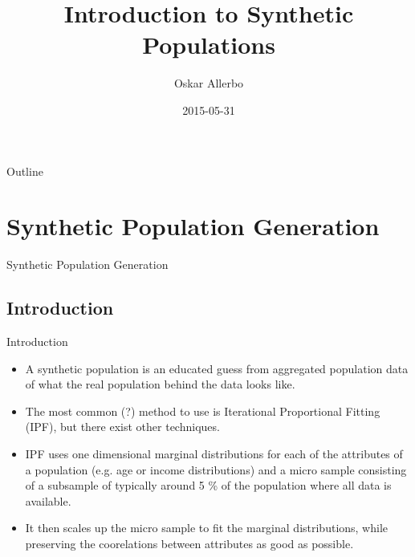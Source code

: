 \documentclass{beamer}
\title[Synthetic Populations]{Introduction to Synthetic Populations}
\author{Oskar Allerbo}
\institute{CoeGSS / Chalmers}
\date{2015-05-31}
\begin{document}
\begin{frame}
  \titlepage
\end{frame}


\begin{frame}{Outline}
  \tableofcontents
\end{frame}

\section{Synthetic Population Generation}
\begin{frame}
  \centering
  \LARGE 
  Synthetic Population Generation
\end{frame}

\subsection{Introduction}
\begin{frame}{Introduction}
\begin{itemize}
  \item A synthetic population is an educated guess from aggregated population data of what the real population behind the data looks like.
  \item The most common (?) method to use is Iterational Proportional Fitting (IPF), but there exist other techniques.
  \item IPF uses one dimensional marginal distributions for each of the attributes of a population (e.g. age or income distributions) and a
micro sample consisting of a subsample of typically around 5 \% of the population where all data is available.
  \item It then scales up the micro sample to fit the marginal distributions, while preserving the coorelations between attributes as good as possible.
\end{itemize}
\end{frame}
\end{document}
